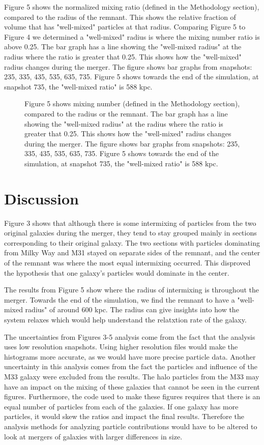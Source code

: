 \documentclass[linenumbers,trackchanges,twocolumn]{aastex7}
\begin{document}
Figure 5 shows the normalized mixing ratio (defined in the Methodology section), compared to the radius of the remnant. This shows the relative fraction of volume that has "well-mixed" particles at that radius. Comparing Figure 5 to Figure 4 we determined a "well-mixed" radius is where the mixing number ratio is above 0.25. The bar graph has a line showing the "well-mixed radius" at the radius where the ratio is greater that 0.25.  This shows how the "well-mixed" radius changes during the merger. The figure shows bar graphs from snapshots: 235, 335, 435, 535, 635, 735. Figure 5 shows towards the end of the simulation, at snapshot 735, the "well-mixed ratio" is 588 kpc.
\begin{figure}[ht!]
\caption{Figure 5 shows mixing number (defined in the Methodology section), compared to the radius or the remnant. The bar graph has a line showing the "well-mixed radius" at the radius where the ratio is greater that 0.25.  This shows how the "well-mixed" radius changes during the merger. The figure shows bar graphs from snapshots: 235, 335, 435, 535, 635, 735. Figure 5 shows towards the end of the simulation, at snapshot 735, the "well-mixed ratio" is 588 kpc. 
\label{fig:general}}
\end{figure}

\section{Discussion} \label{sec:style}
 Figure 3 shows that although there is some intermixing of particles from the two original galaxies during the merger, they tend to stay grouped mainly in sections corresponding to their original galaxy. The two sections with particles dominating from Milky Way and M31 stayed on separate sides of the remnant, and the center of the remnant was where the most equal intermixing occurred. This disproved the hypothesis that one galaxy's particles would dominate in the center. 

The results from Figure 5 show where the radius of intermixing is throughout the merger. Towards the end of the simulation, we find the remnant to have a "well-mixed radius" of around 600 kpc. The radius can give insights into how the system relaxes which would help understand the relatxtion rate of the galaxy. 

The uncertainties from Figures 3-5 analysis come from the fact that the analysis uses low resolution snapshots. Using higher resolution files would make the histograms more accurate, as we would have more precise particle data. Another uncertainty in this analysis comes from the fact the particles and influence of the M33 galaxy were excluded from the results. The halo particles from the M33 may have an impact on the mixing of these galaxies that cannot be seen in the current figures. Furthermore, the code used to make these figures requires that there is an equal number of particles from each of the galaxies. If one galaxy has more particles, it would skew the ratios and impact the final results. Therefore the analysis methods for analyzing particle contributions would have to be altered to look at mergers of galaxies with larger differences in size.
\end{document}
